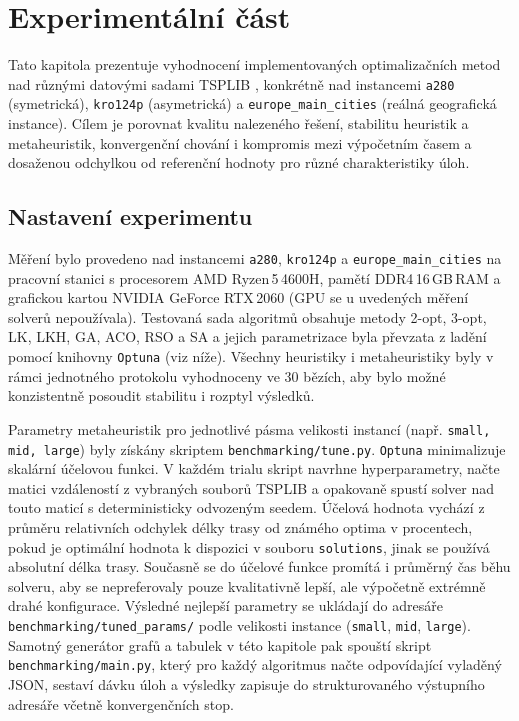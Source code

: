 \chapter{Experimentální část}
Tato kapitola prezentuje vyhodnocení implementovaných optimalizačních metod nad různými datovými sadami TSPLIB \cite{reinelt1994tsplib,tsplib95}, konkrétně nad instancemi \texttt{a280} \cite{tsplib_a280_github} (symetrická), \texttt{kro124p} \cite{tsplib_kro124p_rice} (asymetrická) a \texttt{europe\_main\_cities} (reálná geografická instance). Cílem je porovnat kvalitu nalezeného řešení, stabilitu heuristik a metaheuristik, konvergenční chování i kompromis mezi výpočetním časem a dosaženou odchylkou od referenční hodnoty pro různé charakteristiky úloh.

\section{Nastavení experimentu}
\label{sec:exp_setup}
Měření bylo provedeno nad instancemi \texttt{a280}, \texttt{kro124p} a \texttt{europe\_main\_cities} na pracovní stanici s procesorem AMD Ryzen\,5\,4600H, pamětí DDR4\,16\,GB\,RAM a grafickou kartou NVIDIA GeForce RTX\,2060 (GPU se u uvedených měření solverů nepoužívala). Testovaná sada algoritmů obsahuje metody 2-opt, 3-opt, LK, LKH, GA, ACO, RSO a SA a jejich parametrizace byla převzata z ladění pomocí knihovny \texttt{Optuna} (viz níže). Všechny heuristiky i metaheuristiky byly v rámci jednotného protokolu vyhodnoceny ve 30 bězích, aby bylo možné konzistentně posoudit stabilitu i rozptyl výsledků.

Parametry metaheuristik pro jednotlivé pásma velikosti instancí (např. \texttt{small, mid, large}) byly získány skriptem \texttt{benchmarking/tune.py}. \texttt{Optuna} minimalizuje skalární účelovou funkci. V každém trialu skript navrhne hyperparametry, načte matici vzdáleností z vybraných souborů TSPLIB a opakovaně spustí solver nad touto maticí s deterministicky odvozeným seedem. Účelová hodnota vychází z průměru relativních odchylek délky trasy od známého optima v procentech, pokud je optimální hodnota k dispozici v souboru \texttt{solutions}, jinak se používá absolutní délka trasy. Současně se do účelové funkce promítá i průměrný čas běhu solveru, aby se nepreferovaly pouze kvalitativně lepší, ale výpočetně extrémně drahé konfigurace. Výsledné nejlepší parametry se ukládají do adresáře \texttt{benchmarking/tuned\_params/} podle velikosti instance (\texttt{small}, \texttt{mid}, \texttt{large}). Samotný generátor grafů a tabulek v této kapitole pak spouští skript \texttt{benchmarking/main.py}, který pro každý algoritmus načte odpovídající vyladěný JSON, sestaví dávku úloh a výsledky zapisuje do strukturovaného výstupního adresáře včetně konvergenčních stop.

